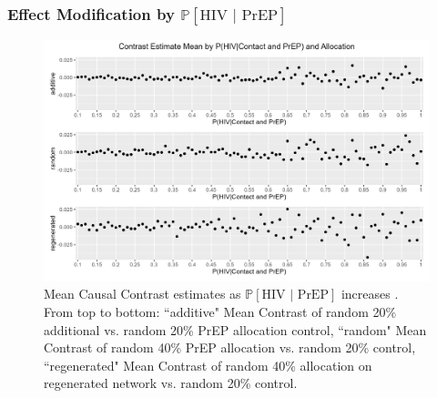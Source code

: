 \documentclass{article}
\theoremstyle{definition}
\begin{document}
\subsubsection{Effect Modification by $\mathbb{P}\left[\text{HIV } \vert \text{ PrEP}\right]$}
\begin{figure}[H]
    \centering
    \includegraphics[scale=0.75]{Figures/p2 Mean plots.png}
    \caption{Mean Causal Contrast estimates as $\mathbb{P}\left[\text{HIV } \vert \text{ PrEP}\right]$ increases . From top to bottom: ``additive" Mean Contrast of random 20\% additional vs. random 20\% PrEP allocation control, ``random" Mean Contrast of random 40\% PrEP allocation vs. random 20\% control, ``regenerated" Mean Contrast of random 40\% allocation on regenerated network vs. random 20\% control.}
    \label{fig:Figure 15}
\end{figure}
\end{document}

